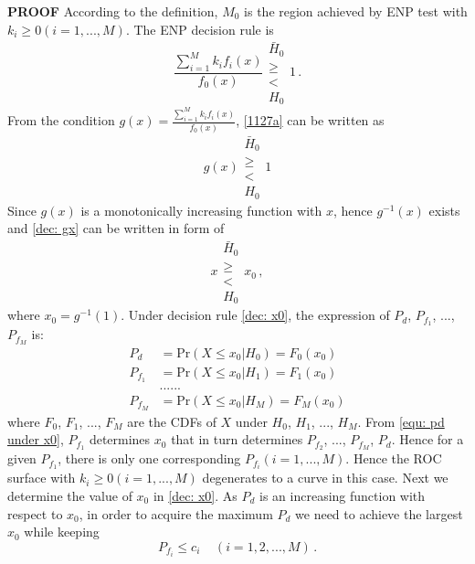   \noindent \textbf{PROOF}
  According to the definition, $M_0$ is the region achieved by ENP test with $k_i \geq 0 (i=1, ..., M)$. The ENP decision rule is
  \begin{equation}
	\label{1127a}
	\frac{\sum_{i=1}^{M}k_if_i(x)}{f_0(x)} \substack{\bar{H}_0 \\\geq\\< \\H_0}1\,.
  \end{equation}
  From the condition $g(x) = \frac{\sum_{i=1}^{M}k_if_i(x)}{f_0(x)} $, \eqref{1127a} can be written as 
  \begin{equation}
	\label{dec: gx}
	g(x)\substack{\bar{H}_0 \\\geq\\< \\H_0}1
  \end{equation}
  Since $g(x)$ is a monotonically increasing function with $x$, hence $g^{-1}(x)$ exists and \eqref{dec: gx} can be written in form of 
  \begin{equation}
	\label{dec: x0}
	x\substack{\bar{H}_0 \\\geq\\< \\H_0}x_0\,,
  \end{equation}
  where $x_0 = g^{-1}(1)$.
  Under decision rule \eqref{dec: x0}, the expression of $P_d$, $P_{f_1}$, ..., $P_{f_M}$ is: 
  \begin{equation}
	\begin{split}
	  \label{equ: pd under x0}
	  P_d &= \text{Pr}(X \leq x_0 | H_0) = F_0(x_0)\\
	  P_{f_1} &= \text{Pr}(X \leq x_0 | H_1) = F_1(x_0)\\
	  &......\\
	  P_{f_M} &= \text{Pr}(X \leq x_0 | H_M) = F_M(x_0)
	\end{split}
  \end{equation}
  where $F_0$, $F_1$, ..., $F_M$ are the CDFs of $X$ under $H_0$, $H_1$, ..., $H_M$. From \eqref{equ: pd under x0}, $P_{f_1}$ determines $x_0$ that in turn determines $P_{f_2}$, ..., $P_{f_M}$, $P_d$. Hence for a given $P_{f_1}$, there is only one corresponding $P_{f_i} (i= 1, ..., M)$. Hence the ROC surface with $k_i \geq 0 (i = 1, ..., M)$ degenerates to a curve in this case.
  Next we determine the value of $x_0$ in \eqref{dec: x0}. 
  As $P_d$ is an increasing function with respect to $x_0$, in order to acquire the maximum $P_d$ we need to achieve the largest $x_0$ while keeping 
  \begin{equation}
	P_{f_i} \leq c_i\;\;\;\;(i = 1, 2, ..., M)\,.
  \end{equation}
